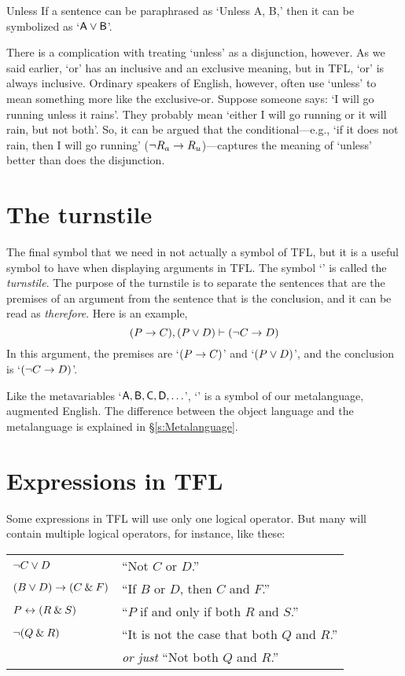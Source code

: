 \begin{factboxy}{Unless}
		If a sentence can be paraphrased as `Unless A, B,' then it can be symbolized as `$\mathsf{A}\vee\mathsf{B}$'.
\end{factboxy}

There is a complication with treating `unless' as a disjunction, however. As we said earlier, `or' has an inclusive and an exclusive meaning, but in TFL, `or' is always inclusive. Ordinary speakers of English, however, often use `unless' to mean something more like the exclusive-or. Suppose someone says: `I will go running unless it rains'. They probably mean `either I will go running or it will rain, but not both'. So, it can be argued that the conditional---e.g., `if it does not rain, then I will go running' (${\neg} R_a \rightarrow R_u$)---captures the meaning of `unless' better than does the disjunction.


\section{The turnstile}

The final symbol that we need in not actually a symbol of TFL, but it is a useful symbol to have when displaying arguments in TFL. The symbol `\proves' is called the \textit{turnstile}. The purpose of the turnstile is to separate the sentences that are the premises of an argument from the sentence that is the conclusion, and it can be read as \textit{therefore}. Here is an example,
$$(P \rightarrow C), (P \vee D) \vdash ({\neg} C \rightarrow D)$$
In this argument, the premises are `$(P \rightarrow C)$' and `$(P \vee D)$', and the conclusion is `$({\neg} C \rightarrow D)$'.


\begin{notebox}
Like the metavariables `$\mathsf{A}, \mathsf{B}, \mathsf{C}, \mathsf{D}, \ldots$', `\proves' is a symbol of our metalanguage, augmented English. The difference between the object language and the metalanguage is explained in \S\ref{s:Metalanguage}.
\end{notebox}


\section{Expressions in TFL}

Some expressions in TFL will use only one logical operator. But many will contain multiple logical operators, for instance, like these:

\begin{table*}[h]
\begin{tabular}{l  l}
${\neg} C \vee D$ \qquad \qquad \qquad \qquad  & ``Not $C$ or $D$.''\\
$(B \vee D) \rightarrow (C \mathbin{\&} F)$ & ``If $B$ or $D$, then $C$ and $F$.''\\
$P \leftrightarrow (R \mathbin{\&} S)$ & ``$P$ if and only if both $R$ and $S$.''\\
${\neg}(Q \mathbin{\&} R)$ & ``It is not the case that both $Q$ and $R$.''\\
&\textit{or just} ``Not both $Q$ and $R$.'' 
\end{tabular}
\end{table*}

